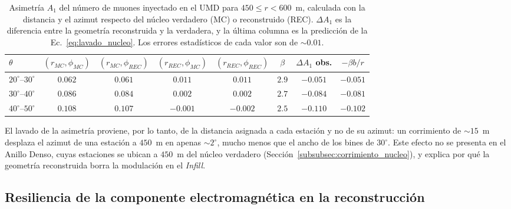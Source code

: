 \begin{table}[H]
	\centering
	\begin{tabular}{lccccccc}
		\toprule
		$\theta$ & $(r_{MC},\phi_{MC})$ & $(r_{MC},\phi_{REC})$ & $(r_{REC},\phi_{MC})$ & $(r_{REC},\phi_{REC})$ & $\beta$ & $\Delta A_1$ obs. & $-\beta b/r$ \\
		\midrule
		$20^\circ$--$30^\circ$ & $0.062$ & $0.061$ & $0.011$ & $0.011$ & $2.9$ & $-0.051$ & $-0.051$ \\
		$30^\circ$--$40^\circ$ & $0.086$ & $0.084$ & $0.002$ & $0.002$ & $2.7$ & $-0.084$ & $-0.081$ \\
		$40^\circ$--$50^\circ$ & $0.108$ & $0.107$ & $-0.001$ & $-0.002$ & $2.5$ & $-0.110$ & $-0.102$ \\
		\bottomrule
	\end{tabular}
	\caption{Asimetría $A_1$ del número de muones inyectado en el UMD para $450 \leq r < 600$~m, calculada con la distancia y el azimut respecto del núcleo verdadero (MC) o reconstruido (REC). $\Delta A_1$ es la diferencia entre la geometría reconstruida y la verdadera, y la última columna es la predicción de la Ec.~\ref{eq:lavado_nucleo}. Los errores estadísticos de cada valor son de $\sim 0.01$.}
	\label{tab:lavado_nucleo}
\end{table}

El lavado de la asimetría proviene, por lo tanto, de la distancia asignada a cada estación y no de su azimut: un corrimiento de $\sim 15$~m desplaza el azimut de una estación a $450$~m en apenas $\sim 2^\circ$, mucho menos que el ancho de los bines de $30^\circ$. Este efecto no se presenta en el Anillo Denso, cuyas estaciones se ubican a $450$~m del núcleo verdadero (Sección~\ref{subsubsec:corrimiento_nucleo}), y explica por qué la geometría reconstruida borra la modulación en el \textit{Infill}.



\subsection{Resiliencia de la componente electromagnética en la reconstrucción}
\label{subsec:em_rec}

